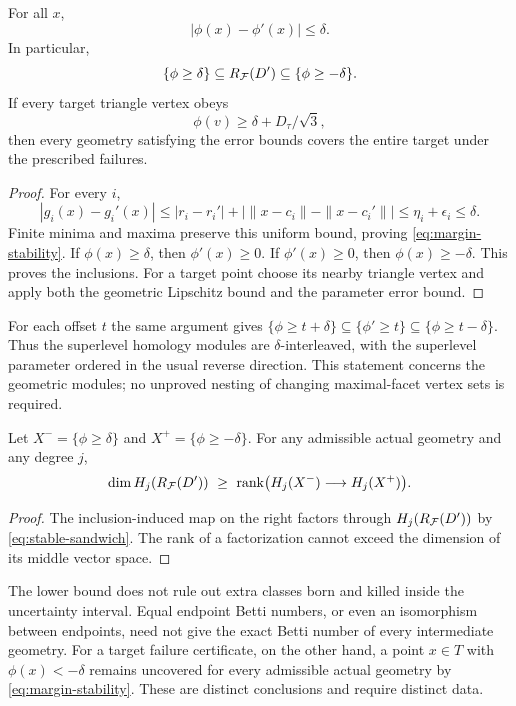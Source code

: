 \begin{theorem}\label{thm:stability}
For all $x$,
\begin{equation}\label{eq:margin-stability}
|\phi(x)-\phi'(x)|\le\delta.
\end{equation}
In particular,
\begin{equation}\label{eq:stable-sandwich}
\{\phi\ge\delta\}\subseteq R_{\mathcal F}(D')\subseteq\{\phi\ge-\delta\}.
\end{equation}
If every target triangle vertex obeys
\[
\phi(v)\ge\delta+D_\tau/\sqrt3,
\]
then every geometry satisfying the error bounds covers the entire target under the prescribed failures.
\end{theorem}
\begin{proof}
For every $i$,
\[
|g_i(x)-g_i'(x)|\le |r_i-r_i'|+
\big|\|x-c_i\|-\|x-c_i'\|\big|\le\eta_i+\epsilon_i\le\delta.
\]
Finite minima and maxima preserve this uniform bound, proving \cref{eq:margin-stability}. If $\phi(x)\ge\delta$, then $\phi'(x)\ge0$. If $\phi'(x)\ge0$, then $\phi(x)\ge-\delta$. This proves the inclusions. For a target point choose its nearby triangle vertex and apply both the geometric Lipschitz bound and the parameter error bound.
\end{proof}

For each offset $t$ the same argument gives $\{\phi\ge t+\delta\}\subseteq\{\phi'\ge t\}\subseteq\{\phi\ge t-\delta\}$. Thus the superlevel homology modules are $\delta$-interleaved, with the superlevel parameter ordered in the usual reverse direction. This statement concerns the geometric modules; no unproved nesting of changing maximal-facet vertex sets is required.

\begin{corollary}
Let $X^-=\{\phi\ge\delta\}$ and $X^+=\{\phi\ge-\delta\}$. For any admissible actual geometry and any degree $j$,
\[
\dim H_j(R_{\mathcal F}(D'))\ \ge\
\operatorname{rank}\bigl(H_j(X^-)\longrightarrow H_j(X^+)\bigr).
\]
\end{corollary}
\begin{proof}
The inclusion-induced map on the right factors through $H_j(R_{\mathcal F}(D'))$ by \cref{eq:stable-sandwich}. The rank of a factorization cannot exceed the dimension of its middle vector space.
\end{proof}

The lower bound does not rule out extra classes born and killed inside the uncertainty interval. Equal endpoint Betti numbers, or even an isomorphism between endpoints, need not give the exact Betti number of every intermediate geometry. For a target failure certificate, on the other hand, a point $x\in T$ with $\phi(x)<-\delta$ remains uncovered for every admissible actual geometry by \cref{eq:margin-stability}. These are distinct conclusions and require distinct data.
